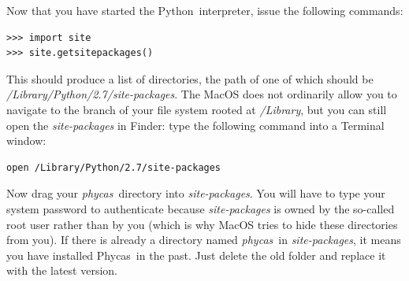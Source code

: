\documentclass[10pt]{article}
\newcommand{\distrfolder}{\pathname{phycas}}
\newcommand{\pathname}[1]{{\em #1}}				%
\newcommand{\python}{{\sc Python}\index{Python}}
\newcommand{\phycas}{{\sc Phycas}\index{Phycas}}
\begin{document}
Now that you have started the \python\ interpreter, issue the following commands:
\begin{verbatim}
>>> import site
>>> site.getsitepackages()
\end{verbatim}
This should produce a list of directories, the path of one of which should be \pathname{/Library/Python/2.7/site-packages}. The MacOS does not ordinarily allow you to navigate to the branch of your file system rooted at \pathname{/Library}, but you can still open the \pathname{site-packages} in Finder: type the following command into a Terminal window:
\begin{verbatim}
open /Library/Python/2.7/site-packages
\end{verbatim}
Now drag your \distrfolder\ directory into \pathname{site-packages}. You will have to type your system password to authenticate because \pathname{site-packages} is owned by the so-called root user rather than by you (which is why MacOS tries to hide these directories from you). If there is already a directory named \distrfolder\ in \pathname{site-packages}, it means you have installed \phycas\ in the past. Just delete the old folder and replace it with the latest version.
\end{document}
